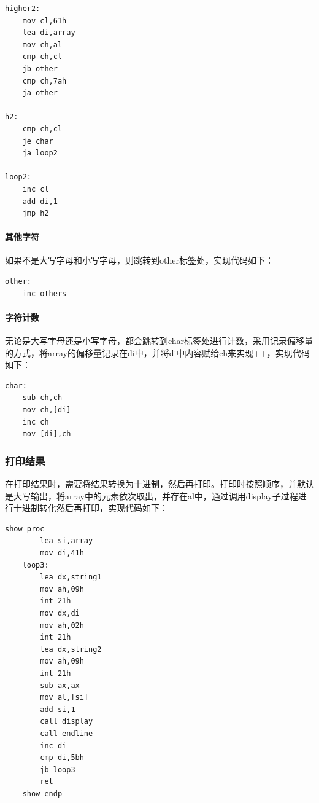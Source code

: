 \documentclass[UTF8,12pt]{article}
\begin{document}
\begin{lstlisting}[title=第二轮比较,frame=shadowbox]
    higher2:
    mov cl,61h
    lea di,array
    mov ch,al
    cmp ch,cl
    jb other
    cmp ch,7ah
    ja other

h2:
    cmp ch,cl
    je char
    ja loop2

loop2:
    inc cl
    add di,1
    jmp h2
\end{lstlisting}

\paragraph{其他字符}
如果不是大写字母和小写字母，则跳转到other标签处，实现代码如下：

\begin{lstlisting}[title=其他字符,frame=shadowbox]
    other:
    inc others
\end{lstlisting}

\paragraph{字符计数}
无论是大写字母还是小写字母，都会跳转到char标签处进行计数，采用记录偏移量的方式，将array的偏移量记录在di中，并将di中内容赋给ch来实现++，实现代码如下：

\begin{lstlisting}[title=字符计数,frame=shadowbox]
    char:
    sub ch,ch
    mov ch,[di]
    inc ch
    mov [di],ch
\end{lstlisting}

\subsubsection{打印结果}
在打印结果时，需要将结果转换为十进制，然后再打印。打印时按照顺序，并默认是大写输出，将array中的元素依次取出，并存在al中，通过调用display子过程进行十进制转化然后再打印，实现代码如下：

\begin{lstlisting}[title=打印结果,frame=shadowbox]
    show proc
        lea si,array
        mov di,41h
    loop3:
        lea dx,string1
        mov ah,09h
        int 21h
        mov dx,di
        mov ah,02h
        int 21h
        lea dx,string2
        mov ah,09h
        int 21h
        sub ax,ax
        mov al,[si]
        add si,1
        call display
        call endline
        inc di
        cmp di,5bh
        jb loop3
        ret
    show endp
\end{lstlisting}
\end{document}
